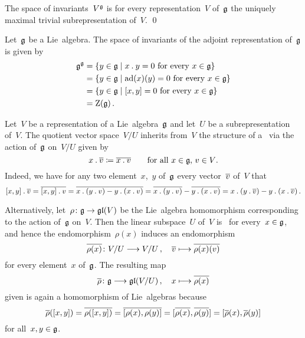 

\begin{lemma}
  The space of invariants~$V^{\mathfrak{g}}$ is for every representation~$V$ of~$\glie$ the uniquely maximal trivial subrepresentation of~$V$.
  \qed
\end{lemma}


\begin{example}
  Let~$\glie$ be a Lie~algebra.
  The space of invariants of the adjoint representation of~$\glie$ is given by
  \begin{align*}
    \glie^{\glie}
    &=
    \{
      y \in \glie
    \suchthat
      \text{$x \act y = 0$ for every~$x \in \glie$}
    \}
    \\
    &=
    \{
      y \in \glie
    \suchthat
      \text{$\ad(x)(y) = 0$ for every~$x \in \glie$}
    \}
    \\
    &=
    \{
      y \in \glie
    \suchthat
      \text{$[x,y] = 0$ for every~$x \in \glie$}
    \}
    \\
    &=
    \centerlie(\glie) \,.
  \end{align*}
\end{example}


\begin{example}
  \label{quotient representation}
  Let~$V$ be a representation of a Lie~algebra~$\glie$ and let~$U$ be a subrepresentation of~$V$.
  The quotient vector space~$V/U$ inherits from~$V$ the structure of a~{\representation{$\glie$}} via the action of~$\glie$ on~$V/U$ given by
  \[
    x \mathbin{.} \overline{v}
    \coloneqq
    \overline{x \mathbin{.} v}
    \qquad
    \text{for all~$x \in \mathfrak{g}$,~$v \in V$}.
  \]
  Indeed, we have for any two element~$x$,~$y$ of~$\glie$ every vector~$\overline{v}$ of~$V$ that
  \[
    [x,y] \mathbin{.} \overline{v}
    =
    \overline{[x,y] \mathbin{.} v}
    =
    \overline{x \mathbin{.} (y \mathbin{.} v) - y \mathbin{.} (x \mathbin{.} v)}
    =
    \overline{x \mathbin{.} (y \mathbin{.} v)} - \overline{y \mathbin{.} (x \mathbin{.} v)}
    =
    x \mathbin{.} (y \mathbin{.} \overline{v}) - y \mathbin{.} (x \mathbin{.} \overline{v}) \,.
  \]
  
  Alternatively, let~$\rho \colon \glie \to \gllie(V)$ be the Lie~algebra homomorphism corresponding to the action of~$\glie$ on~$V$.
  Then the linear subspace~$U$ of~$V$ is~{} for every~$x \in \mathfrak{g}$, and hence the endomorphism~$\rho(x)$ induces an endomorphism
  \[
    \induced{\rho(x)}
    \colon
    V/U
    \to
    V/U \,,
    \quad
    \class{v}
    \mapsto
    \class{\rho(x)(v)}
  \]
  for every element~$x$ of~$\glie$.
  The resulting map
  \[
    \induced{\rho}
    \colon
    \glie
    \to
    \gllie(V/U) \,,
    \quad
    x
    \mapsto
    \induced{\rho(x)}
  \]
  given is again a homomorphism of Lie~algebras because
  \[
    \overline{\rho}([x,y])
    =
    \overline{\rho([x,y])}
    =
    \overline{[\rho(x), \rho(y)]}
    =
    [\overline{\rho(x)}, \overline{\rho(y)}]
    =
    [\overline{\rho}(x), \overline{\rho}(y)]
  \]
  for all~$x, y \in \mathfrak{g}$.
\end{example}


